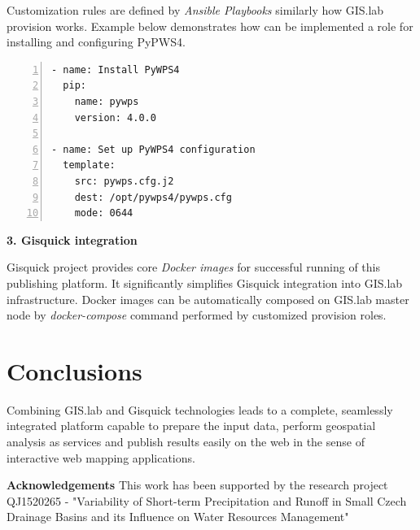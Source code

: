 \documentclass{tudelftposter}
\begin{document}
Customization rules are defined by \textit{Ansible Playbooks}
similarly how GIS.lab provision works. Example below demonstrates how
can be implemented a role for installing and configuring PyPWS4.

\begin{lstlisting}[numbers=left,xleftmargin=1em]
- name: Install PyWPS4
  pip:
    name: pywps
    version: 4.0.0

- name: Set up PyWPS4 configuration
  template:
    src: pywps.cfg.j2
    dest: /opt/pywps4/pywps.cfg
    mode: 0644
\end{lstlisting}

\vskip 0.1in

\textbf{3. Gisquick integration}

Gisquick project provides core \textit{Docker images} for successful
running of this publishing platform. It significantly simplifies
Gisquick integration into GIS.lab infrastructure. Docker images can be
automatically composed on GIS.lab master node by
\textit{docker-compose} command performed by customized provision
roles.

\section{Conclusions}

Combining GIS.lab and Gisquick technologies leads to a complete,
seamlessly integrated platform capable to prepare the input data,
perform geospatial analysis as services and publish results easily on
the web in the sense of interactive web mapping applications.

{\footnotesize \textbf{Acknowledgements} This work has been supported by the research
project QJ1520265 - "Variability of Short-term Precipitation and
Runoff in Small Czech Drainage Basins and its Influence on Water
Resources Management"}
\end{document}
